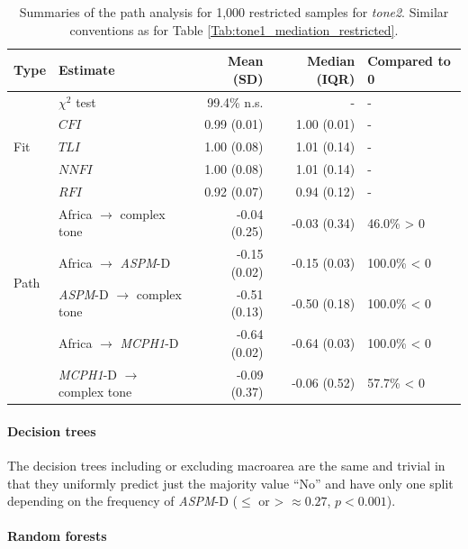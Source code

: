 \documentclass[twoside,onecolumn]{article}
\begin{document}
\begin{table}[h]
  \caption{Summaries of the path analysis for 1,000 restricted samples for \textit{tone2}. Similar conventions as for Table \ref{Tab:tone1_mediation_restricted}.}
  \label{Tab:tone2_path_restricted}
  \centering
  \begin{tabular}{|l|l|r|r|l|}
    \toprule
    \textbf{Type} & \textbf{Estimate} & \textbf{Mean (SD)} & \textbf{Median (IQR)} & \textbf{Compared to 0} \\
    \midrule
    \multirow{5}{*}{Fit} & $\chi^2$ test & 99.4\% n.s. & - & - \\
    & $CFI$              & 0.99 (0.01) & 1.00 (0.01) & - \\
    & $TLI$              & 1.00 (0.08) & 1.01 (0.14) & - \\
    & $NNFI$             & 1.00 (0.08) & 1.01 (0.14) & - \\
    & $RFI$              & 0.92 (0.07) & 0.94 (0.12) & - \\
    \midrule
    \multirow{4}{*}{Path} & Africa $\rightarrow$ complex tone & -0.04 (0.25) & -0.03 (0.34) & 46.0\%  > 0 \\
    & Africa $\rightarrow$ \textit{ASPM}-D                    & -0.15 (0.02) & -0.15 (0.03) & 100.0\% < 0 \\
    & \textit{ASPM}-D  $\rightarrow$ complex tone             & -0.51 (0.13) & -0.50 (0.18) & 100.0\% < 0 \\
    & Africa $\rightarrow$ \textit{MCPH1}-D                   & -0.64 (0.02) & -0.64 (0.03) & 100.0\% < 0 \\
    & \textit{MCPH1}-D $\rightarrow$ complex tone             & -0.09 (0.37) & -0.06 (0.52) & 57.7\%  < 0 \\
    \bottomrule
  \end{tabular}
\end{table}


\paragraph{Decision trees}

The decision trees including or excluding macroarea are the same and trivial in that they uniformly predict just the majority value ``No'' and have only one split depending on the frequency of \textit{ASPM}-D ($\leq$ or > $\approx 0.27$, $p < 0.001$).


\paragraph{Random forests}
\end{document}
